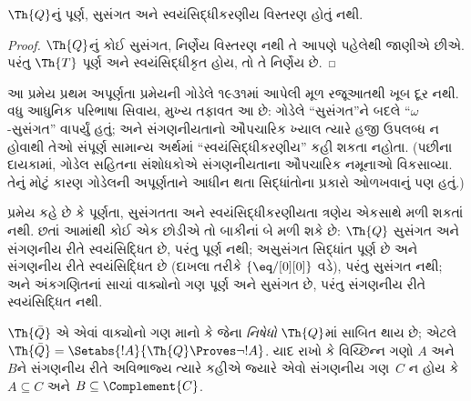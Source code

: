 \begingroup
\makeatletter{}\makeatother


\label{guunit:OLP-0308}


\begin{thm}
$\Th{Q}$નું પૂર્ણ, સુસંગત અને
સ્વયંસિદ્ધીકરણીય વિસ્તરણ
હોતું નથી.
\end{thm}

\begin{proof}
$\Th{Q}$નું કોઈ સુસંગત,
નિર્ણેય વિસ્તરણ નથી
તે આપણે પહેલેથી જાણીએ છીએ.
પરંતુ $\Th{T}$ પૂર્ણ અને
સ્વયંસિદ્ધીકૃત હોય,
તો તે નિર્ણેય છે.
\end{proof}

\begin{explain}
આ પ્રમેય પ્રથમ અપૂર્ણતા
પ્રમેયની ગોડેલે ૧૯૩૧માં
આપેલી મૂળ રજૂઆતથી
ખૂબ દૂર નથી.
વધુ આધુનિક પરિભાષા સિવાય,
મુખ્ય તફાવત આ છે:
ગોડેલે ``સુસંગત''ને બદલે
``$\omega$-સુસંગત''
વાપર્યું હતું; અને સંગણનીયતાનો
ઔપચારિક ખ્યાલ ત્યારે હજી
ઉપલબ્ધ ન હોવાથી તેઓ
સંપૂર્ણ સામાન્ય અર્થમાં
``સ્વયંસિદ્ધીકરણીય'' કહી
શકતા નહોતા. (પછીના
દાયકામાં, ગોડેલ સહિતના
સંશોધકોએ સંગણનીયતાના
ઔપચારિક નમૂનાઓ વિકસાવ્યા.
તેનું મોટું કારણ ગોડેલની
અપૂર્ણતાને આધીન થતા
સિદ્ધાંતોના પ્રકારો ઓળખવાનું
પણ હતું.)

પ્રમેય કહે છે કે પૂર્ણતા,
સુસંગતતા અને
સ્વયંસિદ્ધીકરણીયતા
ત્રણેય એકસાથે મળી શકતાં
નથી. છતાં આમાંથી કોઈ
એક છોડીએ તો બાકીનાં બે
મળી શકે છે: $\Th{Q}$
સુસંગત અને સંગણનીય રીતે
સ્વયંસિદ્ધિત છે, પરંતુ
પૂર્ણ નથી; અસુસંગત
સિદ્ધાંત પૂર્ણ છે અને
સંગણનીય રીતે સ્વયંસિદ્ધિત
છે (દાખલા તરીકે
$\{ \eq/[0][0] \}$ વડે),
પરંતુ સુસંગત નથી; અને
અંકગણિતનાં સાચાં વાક્યોનો
ગણ પૂર્ણ અને સુસંગત છે,
પરંતુ સંગણનીય રીતે
સ્વયંસિદ્ધિત નથી.
\end{explain}
\endgroup


\begingroup
\makeatletter{}\makeatother


\label{guunit:OLP-0309}



$\Th{\bar Q}$ એ એવાં
વાક્યોનો ગણ માનો કે જેના
{\em નિષેધો} $\Th{Q}$માં
સાબિત થાય છે; એટલે
$\Th{\bar Q} = \Setabs{!A}{\Th{Q} \Proves
  \lnot !A}$.
યાદ રાખો કે વિચ્છિન્ન
ગણો $A$ અને $B$ને
સંગણનીય રીતે અવિભાજ્ય
ત્યારે કહીએ જ્યારે એવો
સંગણનીય ગણ~$C$ ન હોય
કે $A \subseteq C$ અને
$B \subseteq \Complement{C}$.

